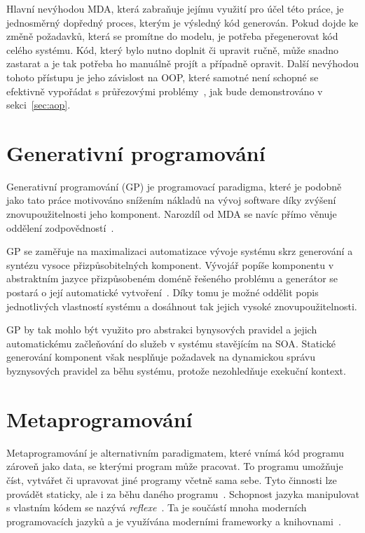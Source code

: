 Hlavní nevýhodou \gls{MDA}, která zabraňuje jejímu využití pro účel této práce,
je jednosměrný dopředný proces, kterým je výsledný kód generován.
Pokud dojde ke změně požadavků, která se promítne do modelu, je potřeba přegenerovat
kód celého systému. Kód, který bylo nutno doplnit či upravit ručně, může snadno zastarat a je tak
potřeba ho manuálně projít a případně opravit. Další nevýhodou tohoto přístupu je jeho závislost na \gls{OOP},
které samotné není schopné se efektivně vypořádat s průřezovými problémy~\cite{cemus2014aspect, kennard2009separation},
jak bude demonstrováno v sekci~\ref{sec:aop}.

\section{Generativní programování}

Generativní programování (\gls{GP}) je programovací paradigma, které je podobně jako
tato práce motivováno snížením nákladů na vývoj software díky zvýšení znovupoužitelnosti
jeho komponent. Narozdíl od \gls{MDA} se navíc přímo věnuje oddělení zodpovědností~\cite{cemus2017separation, czarnecki2000generative}.

\gls{GP} se zaměřuje na maximalizaci automatizace vývoje systému
skrz generování a syntézu vysoce přizpůsobitelných komponent. Vývojář
popíše komponentu v abstraktním jazyce přizpůsobeném doméně řešeného
problému a generátor se postará o její automatické vytvoření~\cite{czarnecki2000generative}.
Díky tomu je možné oddělit popis jednotlivých vlastností systému a dosáhnout tak
jejich vysoké znovupoužitelnosti.

\gls{GP} by tak mohlo být využito pro abstrakci bynysových pravidel a jejich
automatickému začleňování do služeb v systému stavějícím na \gls{SOA}.
Statické generování komponent však nesplňuje požadavek na dynamickou správu
byznysových pravidel za běhu systému, protože nezohledňuje exekuční kontext.

\section{Metaprogramování}

Metaprogramování je alternativním paradigmatem, které vnímá kód programu
zároveň jako data, se kterými program může pracovat. To programu umožňuje
číst, vytvářet či upravovat jiné programy včetně sama sebe. Tyto činnosti
lze provádět staticky, ale i za běhu daného programu~\cite{czarnecki2000generative, sheard2001accomplishments}.
Schopnost jazyka manipulovat s vlastním kódem se nazývá \textit{reflexe}~\cite{sobel1996introduction}.
Ta je součástí mnoha moderních programovacích jazyků a je využívána moderními frameworky a
knihovnami~\cite{forman2004java, vandevoorde2002c++}.

